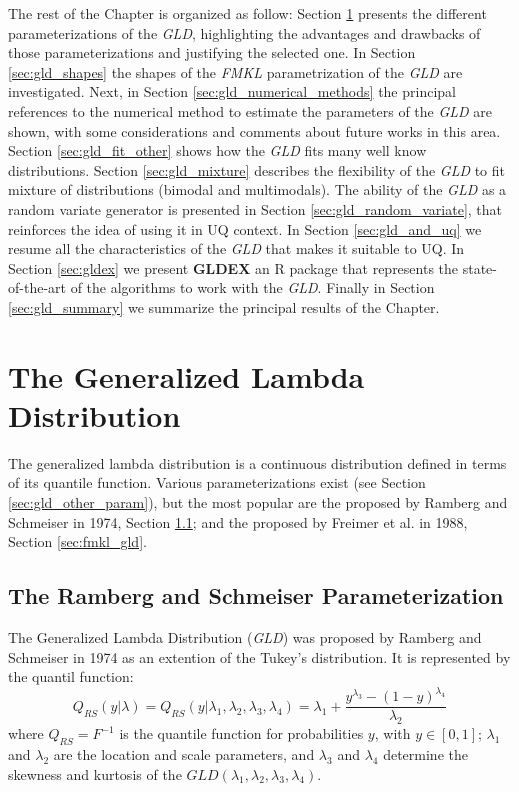 The rest of the Chapter is organized as follow: Section \ref{sec:parameterizations} presents the different parameterizations of the \textit{GLD}, highlighting the advantages and drawbacks of those parameterizations and justifying the selected one. In Section \ref{sec:gld_shapes} the shapes of the \textit{FMKL} parametrization of the \textit{GLD} are investigated. Next, in Section \ref{sec:gld_numerical_methods} the principal references to the numerical method to estimate the parameters of the \textit{GLD} are shown, with some considerations and comments about future works in this area. Section \ref{sec:gld_fit_other} shows how the \textit{GLD} fits many well know distributions. Section \ref{sec:gld_mixture} describes the flexibility of the \textit{GLD} to fit mixture of distributions (bimodal and multimodals). The ability of the \textit{GLD} as a random variate generator is presented in Section \ref{sec:gld_random_variate}, that reinforces the idea of using it in UQ context. In Section \ref{sec:gld_and_uq} we resume all the characteristics of the \textit{GLD} that makes it suitable to UQ. In Section \ref{sec:gldex} we present \textbf{GLDEX} an R package that represents the state-of-the-art of the algorithms to work with the \textit{GLD}. Finally in Section \ref{sec:gld_summary} we summarize the principal results of the Chapter.

\section{The Generalized Lambda Distribution}\label{sec:parameterizations}

The generalized lambda distribution is a continuous distribution defined in terms of its quantile function. Various parameterizations exist (see Section \ref{sec:gld_other_param}), but the most popular are the proposed by Ramberg and Schmeiser in 1974, Section \ref{sec:rs_gld}; and the proposed by Freimer et al. in 1988, Section \ref{sec:fmkl_gld}.

\subsection{The Ramberg and Schmeiser Parameterization}\label{sec:rs_gld}
The Generalized Lambda Distribution (\textit{GLD}) was proposed by Ramberg and Schmeiser in 1974 as an extention of the Tukey's distribution. It is represented by the quantil function:
\begin{equation}\label{eq:rs_param}
Q_{RS}(y|\lambda)=Q_{RS}(y|\lambda_{1}, \lambda_{2}, \lambda_{3}, \lambda_{4})=\lambda_{1}+\frac{y^{\lambda_{3}}-(1-y)^{\lambda_{4}}}{\lambda_{2}}
\end{equation}
where $Q_{RS}=F^{-1}$ is the quantile function for probabilities $y$, with $y\in[0,1]$; $\lambda_{1}$ and $\lambda_{2}$ are the location and scale parameters, and $\lambda_{3}$ and $\lambda_{4}$ determine the skewness and kurtosis of the $GLD(\lambda_{1}, \lambda_{2}, \lambda_{3}, \lambda_{4})$.

